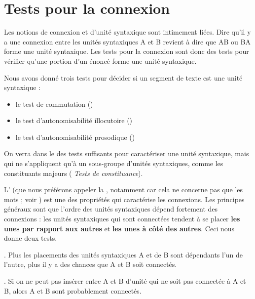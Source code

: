 \section{Tests pour la connexion}\label{sec:3.2.16}

Les notions de connexion et d’unité syntaxique sont intimement liées. Dire qu’il y a une connexion entre les unités syntaxiques A et B revient à dire que AB ou BA forme une unité syntaxique. Les tests pour la connexion sont donc des tests pour vérifier qu’une portion d’un énoncé forme une unité syntaxique.

Nous avons donné trois tests pour décider si un segment de texte est une unité syntaxique :

\begin{itemize}
\item le test de commutation ()
\item le test d’autonomisabilité illocutoire ()
\item le test d’autonomisabilité prosodique ()
\end{itemize}

On verra dans le  des tests suffisants pour caractériser une unité syntaxique, mais qui ne s’appliquent qu’à un sous-groupe d’unités syntaxiques, comme les constituants majeurs ( \textit{Tests de constituance}).

L’ (que nous préférons appeler la , notamment car cela ne concerne pas que les mots ; voir ) est une des propriétés qui caractérise les connexions. Les principes généraux sont que l’ordre des unités syntaxiques dépend fortement des connexions : les unités syntaxiques qui sont connectées tendent à se placer \textbf{les unes par rapport aux autres} et \textbf{les unes à côté des autres}. Ceci nous donne deux tests.

\begin{styleLivreImportant}
. Plus les placements des unités syntaxiques A et de B sont dépendants l’un de l’autre, plus il y a des chances que A et B soit connectés.
\end{styleLivreImportant}

\begin{styleLivreImportant}
. Si on ne peut pas insérer entre A et B d’unité qui ne soit pas connectée à A et B, alors A et B sont probablement connectés.
\end{styleLivreImportant}

